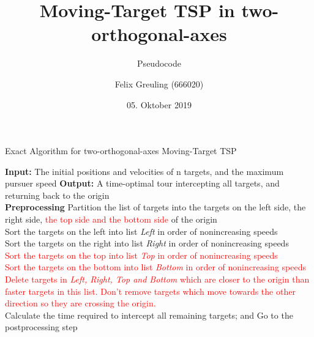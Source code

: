 \documentclass{scrartcl}
\title{Moving-Target TSP in two-orthogonal-axes}
\subtitle{Pseudocode}
\author{Felix Greuling (666020)}
\date{05. Oktober 2019}
\begin{document}
\maketitle


\begin{minipage}{1\linewidth}
\begin{algorithm}[H]
\caption{Exact Algorithm for two-orthogonal-axes Moving-Target TSP}
\begin{algorithmic}
\State \textbf{Input:} The initial positions and velocities of n targets, and the maximum pursuer speed
\State \textbf{Output:} A time-optimal tour intercepting all targets, and returning back to the origin
~ \\
\State \textbf{Preprocessing}
\State Partition the list of targets into the targets on the left side, the right side, \textcolor{red}{the top side and the bottom side} of the origin \\
Sort the targets on the left into list \emph{Left} in order of nonincreasing speeds \\
Sort the targets on the right into list \emph{Right} in order of nonincreasing speeds \\
\textcolor{red}{Sort the targets on the top into list \emph{Top} in order of nonincreasing speeds }\\
\textcolor{red}{Sort the targets on the bottom into list \emph{Bottom} in order of nonincreasing speeds}\\
\textcolor{red}{Delete targets in \emph{Left, Right, Top and Bottom} which are closer to the origin than faster targets in this list. Don't remove targets which move towards the other direction so they are crossing the origin.} \\

\If {\textcolor{red}{3 of the 4 lists are empty}}
\State Calculate the time required to intercept all remaining targets; and 
\State Go to the postprocessing step
\EndIf

\end{algorithmic}
\end{algorithm}
\end{minipage}
\end{document}
